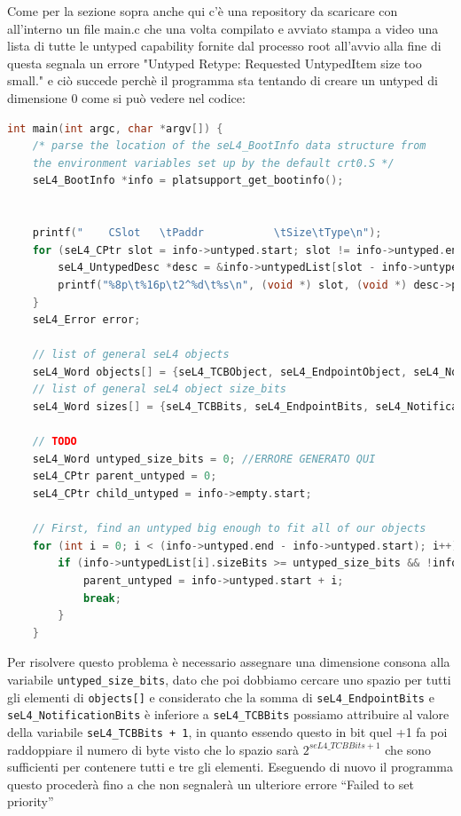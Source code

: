 Come per la sezione sopra anche qui c'è una repository da scaricare con all'interno un file main.c che una volta compilato e avviato stampa a video una lista di tutte le untyped capability fornite dal processo root all'avvio alla fine di questa segnala un errore "Untyped Retype: Requested UntypedItem size too small." e ciò succede perchè il programma sta tentando di creare un untyped di dimensione 0 come si può vedere nel codice:
\begin{lstlisting}[basicstyle=\tiny, language=C++]
int main(int argc, char *argv[]) {
    /* parse the location of the seL4_BootInfo data structure from
    the environment variables set up by the default crt0.S */
    seL4_BootInfo *info = platsupport_get_bootinfo();


    printf("    CSlot   \tPaddr           \tSize\tType\n");
    for (seL4_CPtr slot = info->untyped.start; slot != info->untyped.end; slot++) {
        seL4_UntypedDesc *desc = &info->untypedList[slot - info->untyped.start];
        printf("%8p\t%16p\t2^%d\t%s\n", (void *) slot, (void *) desc->paddr, desc->sizeBits, desc->isDevice ? "device untyped" : "untyped");
    }
    seL4_Error error;

    // list of general seL4 objects
    seL4_Word objects[] = {seL4_TCBObject, seL4_EndpointObject, seL4_NotificationObject};
    // list of general seL4 object size_bits
    seL4_Word sizes[] = {seL4_TCBBits, seL4_EndpointBits, seL4_NotificationBits};
    
    // TODO
    seL4_Word untyped_size_bits = 0; //ERRORE GENERATO QUI
    seL4_CPtr parent_untyped = 0;
    seL4_CPtr child_untyped = info->empty.start;

    // First, find an untyped big enough to fit all of our objects
    for (int i = 0; i < (info->untyped.end - info->untyped.start); i++) {
        if (info->untypedList[i].sizeBits >= untyped_size_bits && !info->untypedList[i].isDevice) {
            parent_untyped = info->untyped.start + i;
            break;
        }
    }
\end{lstlisting}
Per risolvere questo problema è necessario assegnare una dimensione consona alla variabile \texttt{untyped\_size\_bits}, dato che poi dobbiamo cercare uno spazio per tutti gli elementi di \texttt{objects[]} e considerato che la somma di \texttt{seL4\_EndpointBits} e \texttt{seL4\_NotificationBits} è inferiore a \texttt{seL4\_TCBBits} possiamo attribuire al valore della variabile \texttt{seL4\_TCBBits + 1}, in quanto essendo questo in bit quel +1 fa poi raddoppiare il numero di byte visto che lo spazio sarà $ 2^{seL4\_TCBBits + 1} $ che sono sufficienti per contenere tutti e tre gli elementi. Eseguendo di nuovo il programma questo procederà fino a che non segnalerà un ulteriore errore “Failed to set priority”
